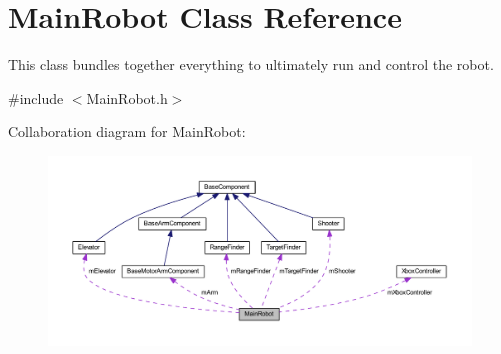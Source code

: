 \hypertarget{class_main_robot}{\section{\-Main\-Robot \-Class \-Reference}
\label{class_main_robot}
}


\-This class bundles together everything to ultimately run and control the robot.  




{\ttfamily \#include $<$\-Main\-Robot.\-h$>$}



\-Collaboration diagram for \-Main\-Robot\-:\nopagebreak
\begin{figure}[H]
\begin{center}
\leavevmode
\includegraphics[width=350pt]{class_main_robot__coll__graph}
\end{center}
\end{figure}

